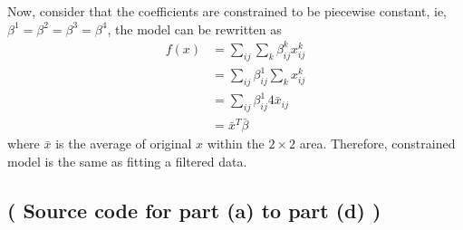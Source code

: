 \documentclass[pra,groupedaddress,amsmath,amssymb, column]{revtex4}
\begin{document}
Now, consider that the coefficients are constrained to be piecewise constant, ie, $\beta^1=\beta^2=\beta^3=\beta^4$, the model can be rewritten as
\begin{align}
f(x) &= \sum_{ij}\sum_k \beta^k_{ij} x^k_{ij}\\
&=\sum_{ij} \beta^1_{ij}\sum_k x^k_{ij}\\
&=\sum_{ij} \beta^1_{ij}4 \bar{x}_{ij}\\
&=\bar{x}^T\bar{\beta}
\end{align}
where $\bar{x}$ is the average of original $x$ within the $2 \times 2$ area.  Therefore, constrained model is the same as fitting a filtered data. 

\subsection*{( Source code for part (a) to part (d) )}
\end{document}
